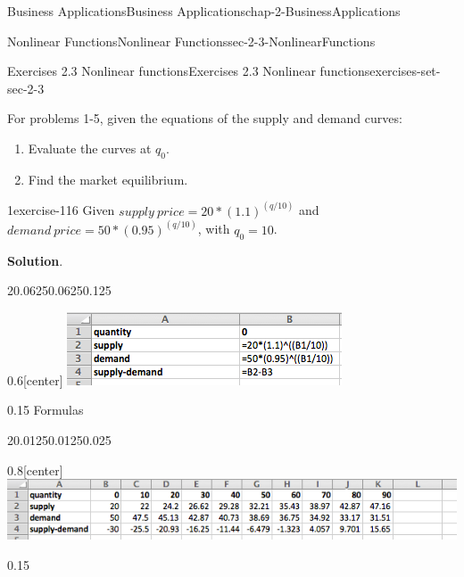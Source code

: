 \documentclass[oneside,10pt,]{book}
\numberwithin{equation}{section}
\begin{document}
\begin{chapterptx}{Business Applications}{}{Business Applications}{}{}{chap-2-BusinessApplications}
\begin{sectionptx}{Nonlinear Functions}{}{Nonlinear Functions}{}{}{sec-2-3-NonlinearFunctions}
%
\begin{exercises-subsection-numberless}{Exercises 2.3 Nonlinear functions}{}{Exercises 2.3 Nonlinear functions}{}{}{exercises-set-sec-2-3}
\par\medskip\noindent%
\hypertarget{exercisegroup-9}{}%
\hypertarget{p-801}{}%
For problems 1-5, given the equations of the supply and demand curves:%
\leavevmode%
\begin{enumerate}[label=(\alph*)]
\item\hypertarget{li-222}{}\hypertarget{p-802}{}%
Evaluate the curves at \(q_0\).%
\item\hypertarget{li-223}{}\hypertarget{p-803}{}%
Find the market equilibrium.%
\end{enumerate}
\begin{exercisegroup}
\begin{divisionexerciseeg}{1}{}{}{exercise-116}%
\hypertarget{p-804}{}%
Given \(supply\ price=20*(1.1)^{(q/10)}\) and \(demand\ price=50*(0.95)^{(q/10)}\), with \(q_0=10\).%
\par\smallskip%
\noindent\textbf{Solution}.\hypertarget{solution-56}{}\quad%
\leavevmode%
\begin{sidebyside}{2}{0.0625}{0.0625}{0.125}%
\begin{sbspanel}{0.6}[center]%
\includegraphics[width=1\linewidth]{images/sec2-3-sol1a.png}
\end{sbspanel}%
\begin{sbspanel}{0.15}%
\hypertarget{p-805}{}%
Formulas%
\end{sbspanel}%
\end{sidebyside}%
\begin{sidebyside}{2}{0.0125}{0.0125}{0.025}%
\begin{sbspanel}{0.8}[center]%
\includegraphics[width=1\linewidth]{images/sec2-3-sol1b.png}
\end{sbspanel}%
\begin{sbspanel}{0.15}%

\end{sbspanel}
\end{sidebyside}
\end{divisionexerciseeg}
\end{exercisegroup}
\end{exercises-subsection-numberless}
\end{sectionptx}
\end{chapterptx}
\end{document}
